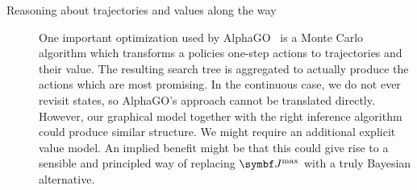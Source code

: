 \begin{description}
    \item[Reasoning about trajectories and values along the way]
        One important optimization used by AlphaGO~\parencite{silver_mastering_2017} is a Monte Carlo algorithm which transforms a policies one-step actions to trajectories and their value.
        The resulting search tree is aggregated to actually produce the actions which are most promising.
        In the continuous case, we do not ever revisit states, so AlphaGO's approach cannot be translated directly.
        However, our graphical model together with the right inference algorithm could produce similar structure.
        We might require an additional explicit value model.
        An implied benefit might be that this could give rise to a sensible and principled way of replacing $\mat{J}^{\text{max}}$ with a truly Bayesian alternative.
\end{description}


\nocite{*}
\printbibliography


